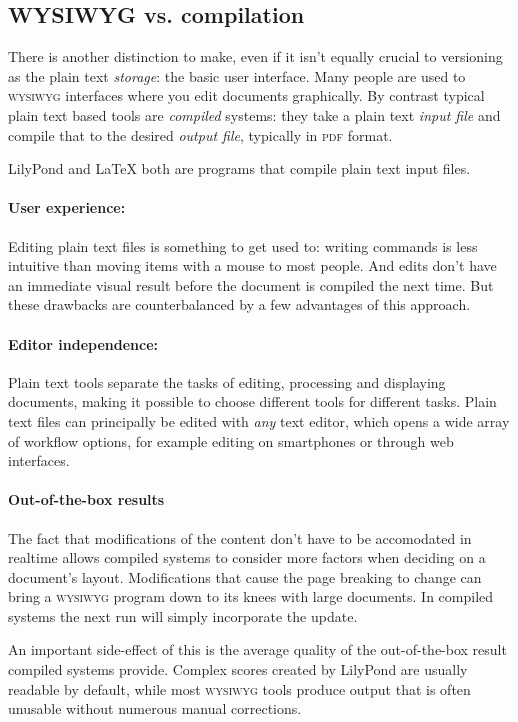 \documentclass[11pt,a4paper]{article}
\begin{document}
\subsection{WYSIWYG vs. compilation}
There is another distinction to make, even if it isn't equally crucial to versioning
as the plain text \emph{storage}: the basic user interface. Many people are used to
\textsc{wysiwyg} interfaces where you edit documents graphically. By contrast typical
plain text based tools are \emph{compiled} systems: they take a plain text \emph{input
file} and compile that to the desired \emph{output file}, typically in
\textsc{pdf} format.

LilyPond and \LaTeX{} both are programs that compile plain text input files.

\paragraph{User experience:}
Editing plain text files is something to get used to: writing commands is less intuitive
than moving items with a mouse to most people. And edits don't have an immediate visual
result before the document is compiled the next time. But these drawbacks are counterbalanced
by a few advantages of this approach.

\paragraph{Editor independence:}
Plain text tools separate the tasks of editing, processing and displaying documents,
making it possible to choose different tools for different tasks. Plain text files
can principally be edited with \emph{any} text editor, which opens a wide array of
workflow options, for example editing on smartphones or through web interfaces.

\paragraph{Out-of-the-box results}
The fact that modifications of the content don't have to be accomodated in realtime
allows compiled systems to consider more factors when deciding on a document's layout.
Modifications that cause the page breaking to change can bring a
\textsc{wysiwyg} program down to its knees with large documents. In compiled systems the
next run will simply incorporate the update.

An important side-effect of this is the average quality of the out-of-the-box result
compiled systems provide. Complex scores created by LilyPond are usually readable by
default, while most \textsc{wysiwyg} tools produce output that is often unusable without
numerous manual corrections.
\end{document}
